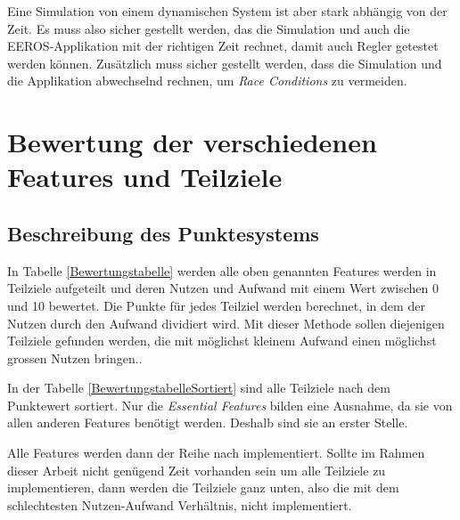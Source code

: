 Eine Simulation von einem dynamischen System ist aber stark abhängig von der Zeit.
Es muss also sicher gestellt werden, das die Simulation und auch die EEROS-Applikation mit der richtigen Zeit rechnet, damit auch Regler getestet werden können.
Zusätzlich muss sicher gestellt werden, dass die Simulation und die Applikation abwechselnd rechnen, um \textit{Race Conditions} zu vermeiden.


\section{Bewertung der verschiedenen Features und Teilziele}
\subsection{Beschreibung des Punktesystems}
In Tabelle \ref{Bewertungstabelle} werden alle oben genannten Features werden in Teilziele aufgeteilt und deren Nutzen und Aufwand mit einem Wert zwischen 0 und 10 bewertet.
Die Punkte für jedes Teilziel werden berechnet, in dem der Nutzen durch den Aufwand dividiert wird.
Mit dieser Methode sollen diejenigen Teilziele gefunden werden, die mit möglichst kleinem Aufwand einen möglichst grossen Nutzen bringen..

In der Tabelle \ref{BewertungstabelleSortiert} sind alle Teilziele nach dem Punktewert sortiert.
Nur die \textit{Essential Features} bilden eine Ausnahme, da sie von allen anderen Features benötigt werden.
Deshalb sind sie an erster Stelle.

Alle Features werden dann der Reihe nach implementiert.
Sollte im Rahmen dieser Arbeit nicht genügend Zeit vorhanden sein um alle Teilziele zu implementieren, dann werden die Teilziele ganz unten, also die mit dem schlechtesten Nutzen-Aufwand Verhältnis, nicht implementiert.


